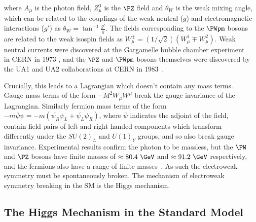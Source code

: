 where $A_{\mu}$ is the photon field, $Z_{\mu}^{0}$ is the $\PZ$ field
and $\theta_{W}$ is the weak mixing angle,
which can be related to the couplings of the weak neutral ($g$) and electromagnetic
interactions ($g'$) as $\theta_{W}=\tan^{-1}{\frac{g'}{g}}$. The fields
corresponding to the $\PWpm$ bosons are related to the weak isospin fields as
$W_{\mu}^{\pm} = (1/\sqrt{2})(W_{\mu}^{1} \mp W_{\mu}^{2})$. Weak neutral
currents were discovered at the Gargamelle bubble chamber experiment in CERN in
1973 \cite{Hasert:1973ff}, and the $\PZ$ and $\PWpm$ bosons themselves were
discovered by the UA1 and UA2 collaborations at CERN in
1983~\cite{Arnison:1983rp,Banner:1983jy,Arnison:1983mk,Bagnaia:1983zx}.

Crucially, this leads to a Lagrangian which doesn't contain any mass terms.
Gauge mass terms of the form $-M^{2}W_{\mu}W^{\mu}$ break the gauge invariance
of the Lagrangian. Similarly fermion mass terms of the form
$-m\overline{\psi}\psi = -m(\overline{\psi_{R}}\psi_{L} +
\overline{\psi_{L}}\psi_{R})$, where $\overline\psi$ indicates the adjoint of
the field, contain field pairs of left and right handed components which transform differently
under the $SU(2)_{L}$ and $U(1)_{Y}$ groups, and so also break gauge invariance.
Experimental results confirm the photon to be massless, but the $\PW$ and $\PZ$
bosons have finite masses of $\approx80.4~\GeV$ and $\approx91.2~\GeV$
respectively, and the fermions also have a range of finite masses~\cite{PDG}. As
such the electroweak symmetry must be spontaneously broken. The mechanism of
electroweak symmetry breaking in the \ac{SM} is the Higgs mechanism.

\subsection{The Higgs Mechanism in the Standard Model}
\label{sec:SMHiggs}

